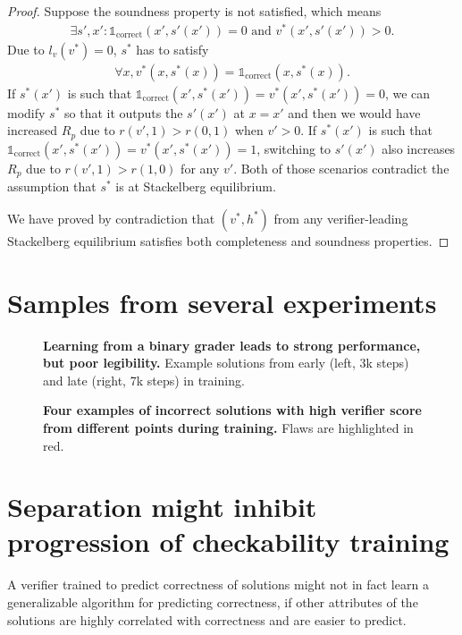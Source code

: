 \documentclass{article}
\newcommand{\indcor}[1]{\mathds{1}_{\text{correct}}\left({#1}\right)}
\begin{document}
\begin{proof}
    Suppose the soundness property is not satisfied, which means
    \begin{align*}
        \exists s', x': \indcor{x', s'(x')} = 0 \text{ and } v^*(x', s'(x')) > 0.
    \end{align*} Due to $l_v(v^*)=0$, $s^*$ has to satisfy
    \begin{align*}
        \forall x, v^*(x, s^*(x)) = \indcor{x, s^*(x)}.
    \end{align*} If $s^*(x')$ is such that $\indcor{x', s^*(x')} = v^*(x', s^*(x')) = 0$, we can modify $s^*$ so that it outputs the $s'(x')$ at $x=x'$ and then we would have increased $R_p$ due to $r(v', 1)>r(0, 1)$ when $v'>0$. If $s^*(x')$ is such that $\indcor{x', s^*(x')} = v^*(x', s^*(x')) = 1$, switching to $s'(x')$ also increases $R_p$ due to $r(v', 1)>r(1, 0)$ for any $v'$. Both of those scenarios contradict the assumption that $s^*$ is at Stackelberg equilibrium.

    We have proved by contradiction that $(v^*, h^*)$ from any verifier-leading Stackelberg equilibrium satisfies both completeness and soundness properties.
\end{proof}
\clearpage

\section{Samples from several experiments}

\begin{figure}[h]
    \centering
    \caption{\textbf{Learning from a binary grader leads to strong performance, but poor legibility.} Example solutions from early (left, 3k steps) and late (right, 7k steps) in training. }
    \label{fig:sup:correctness-only-samples}
\end{figure}

\begin{figure}[h]
    \centering
    \caption{\textbf{Four examples of incorrect solutions with high verifier score from different points during training.} Flaws are highlighted in red.}
    \label{fig:sup:dishonest-examples}
\end{figure}


\clearpage

\section{Separation might inhibit progression of checkability training}
\label{sec:separation}
A verifier trained to predict correctness of solutions might not in fact learn a generalizable algorithm for predicting correctness, if other attributes of the solutions are highly correlated with correctness and are easier to predict.
\end{document}
